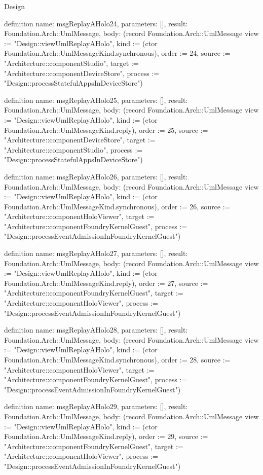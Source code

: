 \begin{lexlean}{Design}
\begin{semanticmodule}
definition{
  name: msgReplayAHolo24,
  parameters: [],
  result: Foundation.Arch::UmlMessage,
  body: (record Foundation.Arch::UmlMessage {view := "Design::viewUmlReplayAHolo", kind := (ctor Foundation.Arch::UmlMessageKind.synchronous), order := 24, source := "Architecture::componentStudio", target := "Architecture::componentDeviceStore", process := "Design::processStatefulAppsInDeviceStore"})
}

definition{
  name: msgReplayAHolo25,
  parameters: [],
  result: Foundation.Arch::UmlMessage,
  body: (record Foundation.Arch::UmlMessage {view := "Design::viewUmlReplayAHolo", kind := (ctor Foundation.Arch::UmlMessageKind.reply), order := 25, source := "Architecture::componentDeviceStore", target := "Architecture::componentStudio", process := "Design::processStatefulAppsInDeviceStore"})
}

definition{
  name: msgReplayAHolo26,
  parameters: [],
  result: Foundation.Arch::UmlMessage,
  body: (record Foundation.Arch::UmlMessage {view := "Design::viewUmlReplayAHolo", kind := (ctor Foundation.Arch::UmlMessageKind.synchronous), order := 26, source := "Architecture::componentHoloViewer", target := "Architecture::componentFoundryKernelGuest", process := "Design::processEventAdmissionInFoundryKernelGuest"})
}

definition{
  name: msgReplayAHolo27,
  parameters: [],
  result: Foundation.Arch::UmlMessage,
  body: (record Foundation.Arch::UmlMessage {view := "Design::viewUmlReplayAHolo", kind := (ctor Foundation.Arch::UmlMessageKind.reply), order := 27, source := "Architecture::componentFoundryKernelGuest", target := "Architecture::componentHoloViewer", process := "Design::processEventAdmissionInFoundryKernelGuest"})
}

definition{
  name: msgReplayAHolo28,
  parameters: [],
  result: Foundation.Arch::UmlMessage,
  body: (record Foundation.Arch::UmlMessage {view := "Design::viewUmlReplayAHolo", kind := (ctor Foundation.Arch::UmlMessageKind.synchronous), order := 28, source := "Architecture::componentHoloViewer", target := "Architecture::componentFoundryKernelGuest", process := "Design::processEventAdmissionInFoundryKernelGuest"})
}

definition{
  name: msgReplayAHolo29,
  parameters: [],
  result: Foundation.Arch::UmlMessage,
  body: (record Foundation.Arch::UmlMessage {view := "Design::viewUmlReplayAHolo", kind := (ctor Foundation.Arch::UmlMessageKind.reply), order := 29, source := "Architecture::componentFoundryKernelGuest", target := "Architecture::componentHoloViewer", process := "Design::processEventAdmissionInFoundryKernelGuest"})
}


\end{semanticmodule}
\end{lexlean}
